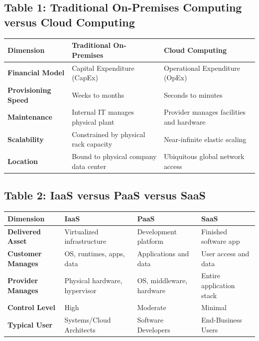 \subsection*{Table 1: Traditional On-Premises Computing versus Cloud Computing}
\begin{center}
\small
\begin{tabularx}{\textwidth}{lXX}
\toprule
\textbf{Dimension} & \textbf{Traditional On-Premises} & \textbf{Cloud Computing} \\
\midrule
\textbf{Financial Model} & Capital Expenditure (CapEx) & Operational Expenditure (OpEx) \\
\textbf{Provisioning Speed} & Weeks to months & Seconds to minutes \\
\textbf{Maintenance} & Internal IT manages physical plant & Provider manages facilities and hardware \\
\textbf{Scalability} & Constrained by physical rack capacity & Near-infinite elastic scaling \\
\textbf{Location} & Bound to physical company data center & Ubiquitous global network access \\
\bottomrule
\end{tabularx}
\end{center}

\subsection*{Table 2: IaaS versus PaaS versus SaaS}
\begin{center}
\small
\begin{tabularx}{\textwidth}{lXXX}
\toprule
\textbf{Dimension} & \textbf{IaaS} & \textbf{PaaS} & \textbf{SaaS} \\
\midrule
\textbf{Delivered Asset} & Virtualized infrastructure & Development platform & Finished software app \\
\textbf{Customer Manages} & OS, runtimes, apps, data & Applications and data & User access and data \\
\textbf{Provider Manages} & Physical hardware, hypervisor & OS, middleware, hardware & Entire application stack \\
\textbf{Control Level} & High & Moderate & Minimal \\
\textbf{Typical User} & Systems/Cloud Architects & Software Developers & End-Business Users \\
\bottomrule
\end{tabularx}
\end{center}

